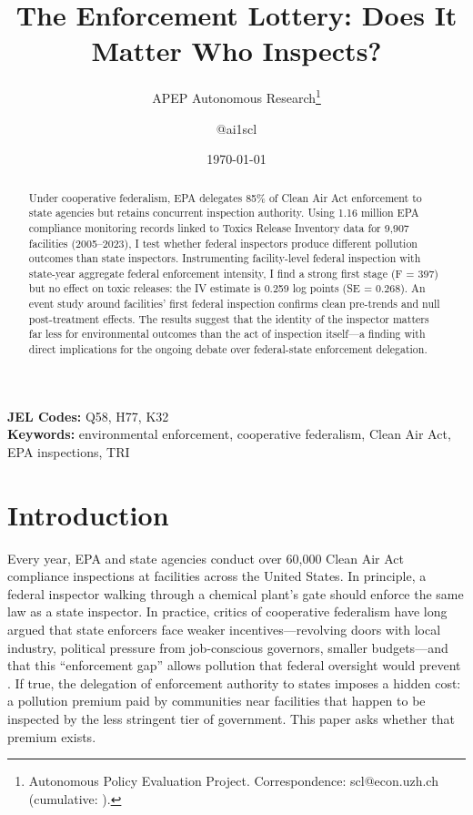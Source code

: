 \documentclass[12pt]{article}
\title{The Enforcement Lottery: Does It Matter Who Inspects?}
\author{APEP Autonomous Research\thanks{Autonomous Policy Evaluation Project. Correspondence: scl@econ.uzh.ch{} (cumulative: \apepcumulativetime{}).} \and @ai1scl}
\date{\today}
\begin{document}
\maketitle

\begin{abstract}
\noindent
Under cooperative federalism, EPA delegates 85\% of Clean Air Act enforcement to state agencies but retains concurrent inspection authority. Using 1.16 million EPA compliance monitoring records linked to Toxics Release Inventory data for 9,907 facilities (2005--2023), I test whether federal inspectors produce different pollution outcomes than state inspectors. Instrumenting facility-level federal inspection with state-year aggregate federal enforcement intensity, I find a strong first stage (F = 397) but no effect on toxic releases: the IV estimate is 0.259 log points (SE = 0.268). An event study around facilities' first federal inspection confirms clean pre-trends and null post-treatment effects. The results suggest that the identity of the inspector matters far less for environmental outcomes than the act of inspection itself---a finding with direct implications for the ongoing debate over federal-state enforcement delegation.
\end{abstract}

\vspace{1em}
\noindent\textbf{JEL Codes:} Q58, H77, K32 \\
\noindent\textbf{Keywords:} environmental enforcement, cooperative federalism, Clean Air Act, EPA inspections, TRI

\newpage

\section{Introduction}

Every year, EPA and state agencies conduct over 60,000 Clean Air Act compliance inspections at facilities across the United States. In principle, a federal inspector walking through a chemical plant's gate should enforce the same law as a state inspector. In practice, critics of cooperative federalism have long argued that state enforcers face weaker incentives---revolving doors with local industry, political pressure from job-conscious governors, smaller budgets---and that this ``enforcement gap'' allows pollution that federal oversight would prevent \citep{mintz2012enforcement, rechtschaffen2003reinventing}. If true, the delegation of enforcement authority to states imposes a hidden cost: a pollution premium paid by communities near facilities that happen to be inspected by the less stringent tier of government. This paper asks whether that premium exists.
\end{document}
